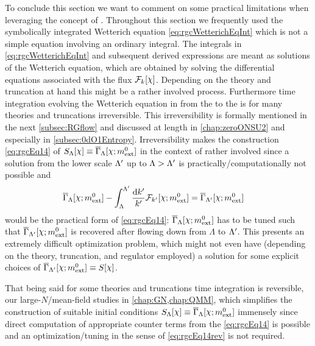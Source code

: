 To conclude this section we want to comment on some practical limitations when leveraging the concept of \rgcy{}.
Throughout this section we frequently used the symbolically integrated Wetterich equation \eqref{eq:rgcWetterichEqInt} which is not a simple equation involving an ordinary integral.
The integrals in \cref{eq:rgcWetterichEqInt} and subsequent derived expressions are meant as solutions of the Wetterich equation, which are obtained by solving the differential equations associated with the \frg{} flux $\FRGflow_{k}[\FSsf]$.
Depending on the theory and truncation at hand this might be a rather involved process.
Furthermore \frg{} time integration \dash{} evolving the Wetterich equation in \rgscale{} from the \uv{} to the \ir{} \dash{} is for many theories and truncations irreversible.
This irreversibility is formally mentioned in the next \cref{subsec:RGflow} and discussed at length in \cref{chap:zeroONSU2} and especially in \cref{subsec:0dO1Entropy}.
Irreversibility makes the construction \eqref{eq:rgcEq14} of $S_\Lambda[\FSsf]\equiv\FSeaa_\Lambda[\FSsf;m_\ext^0]$ in the context of \loefts{} rather involved since a solution from the lower scale ${\Lambda'}$ up to $\Lambda>{\Lambda'}$ is practically/computationally not possible and
\begin{align}
	\FSeaa_\Lambda[\FSsf;m_\ext^0]-\int_\Lambda^\LambdaP \frac{\dif k'}{k'} \FRGflow_{k'}[\FSsf;m_\ext^0] &= \FSeaa_\LambdaP[\FSsf;m_\ext^0]\,
	\label{eq:rgcEq14rev}
\end{align}
would be the practical form of \eqref{eq:rgcEq14}:
$\FSeaa_\Lambda[\FSsf;m_\ext^0]$ has to be tuned such that $\FSeaa_\LambdaP[\FSsf;m_\ext^0]$ is recovered after flowing down from $\Lambda$ to ${\Lambda'}$. 
This presents an extremely difficult optimization problem, which might not even have (depending on the theory, truncation, and regulator employed) a solution for some explicit choices of $\FSeaa_\LambdaP[\FSsf;m_\ext^0]\equiv S[\FSsf]$.

That being said for some theories and truncations \frg{} time integration is reversible, \cf{} our large-$N$/mean-field studies in \cref{chap:GN,chap:QMM}, which simplifies the construction of suitable initial conditions $S_\Lambda[\FSsf]\equiv\FSeaa_\Lambda[\FSsf;m_\ext^0]$ immensely since direct computation of appropriate counter terms from the \cref{eq:rgcEq14} is possible and an optimization/tuning in the sense of \cref{eq:rgcEq14rev} is not required.

